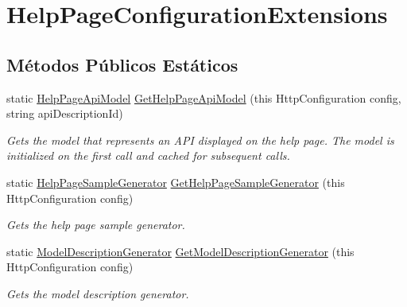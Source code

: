 \hypertarget{classApi3Layers_1_1Areas_1_1HelpPage_1_1HelpPageConfigurationExtensions}{}\section{Help\+Page\+Configuration\+Extensions}
\label{classApi3Layers_1_1Areas_1_1HelpPage_1_1HelpPageConfigurationExtensions}
\subsection*{Métodos Públicos Estáticos}
\begin{DoxyCompactItemize}
\item 
static \hyperlink{classApi3Layers_1_1Areas_1_1HelpPage_1_1Models_1_1HelpPageApiModel}{Help\+Page\+Api\+Model} \hyperlink{classApi3Layers_1_1Areas_1_1HelpPage_1_1HelpPageConfigurationExtensions_a8e1dd06343ebfd465042fb7fde291909}{Get\+Help\+Page\+Api\+Model} (this Http\+Configuration config, string api\+Description\+Id)
\begin{DoxyCompactList}\small\item\em Gets the model that represents an A\+PI displayed on the help page. The model is initialized on the first call and cached for subsequent calls. \end{DoxyCompactList}\item 
static \hyperlink{classApi3Layers_1_1Areas_1_1HelpPage_1_1HelpPageSampleGenerator}{Help\+Page\+Sample\+Generator} \hyperlink{classApi3Layers_1_1Areas_1_1HelpPage_1_1HelpPageConfigurationExtensions_a7f67d57eac84d585f41aabeb28ae7bd0}{Get\+Help\+Page\+Sample\+Generator} (this Http\+Configuration config)
\begin{DoxyCompactList}\small\item\em Gets the help page sample generator. \end{DoxyCompactList}\item 
static \hyperlink{classApi3Layers_1_1Areas_1_1HelpPage_1_1ModelDescriptions_1_1ModelDescriptionGenerator}{Model\+Description\+Generator} \hyperlink{classApi3Layers_1_1Areas_1_1HelpPage_1_1HelpPageConfigurationExtensions_aa3345ea75f3272cdc05598cceeddd7a9}{Get\+Model\+Description\+Generator} (this Http\+Configuration config)
\begin{DoxyCompactList}\small\item\em Gets the model description generator. \end{DoxyCompactList}\item 

\end{DoxyCompactItemize}
